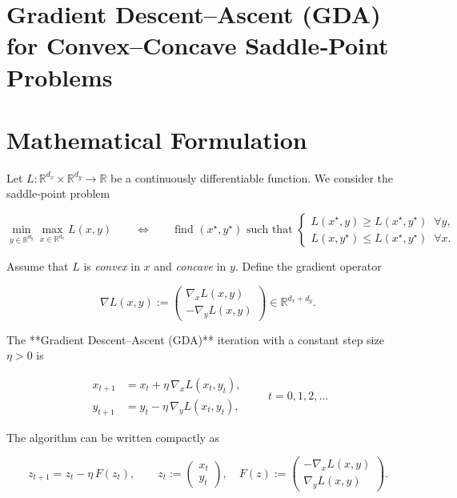 \documentclass{article}
\begin{document}
\section*{Gradient Descent–Ascent (GDA) for Convex–Concave Saddle‑Point Problems}

\section*{Mathematical Formulation}
Let $L:\mathbb{R}^{d_x}\times\mathbb{R}^{d_y}\rightarrow\mathbb{R}$ be a continuously differentiable function.  
We consider the saddle‑point problem  

\[
\min_{y\in\mathbb{R}^{d_y}}\max_{x\in\mathbb{R}^{d_x}} L(x,y)
\qquad\Longleftrightarrow\qquad
\text{find }(x^{\star},y^{\star})\text{ such that }
\begin{cases}
L(x^{\star},y)\ge L(x^{\star},y^{\star})\;\;\forall y,\\[2mm]
L(x,y^{\star})\le L(x^{\star},y^{\star})\;\;\forall x .
\end{cases}
\]

Assume that $L$ is \emph{convex} in $x$ and \emph{concave} in $y$.  
Define the gradient operator  

\[
\nabla L(x,y):=
\begin{pmatrix}
\nabla_{x}L(x,y)\\[1mm]
-\nabla_{y}L(x,y)
\end{pmatrix}
\in\mathbb{R}^{d_x+d_y}.
\]

The **Gradient Descent–Ascent (GDA)** iteration with a constant step size $\eta>0$ is  

\[
\boxed{
\begin{aligned}
x_{t+1}&=x_{t}+ \eta\,\nabla_{x}L(x_{t},y_{t}),\\
y_{t+1}&=y_{t}- \eta\,\nabla_{y}L(x_{t},y_{t}),
\end{aligned}}
\qquad t=0,1,2,\dots
\tag{1}
\]

The algorithm can be written compactly as  

\[
z_{t+1}=z_{t}-\eta\,F(z_{t}),\qquad 
z_{t}:=
\begin{pmatrix}x_{t}\\y_{t}\end{pmatrix},
\quad 
F(z):=
\begin{pmatrix}
-\nabla_{x}L(x,y)\\[1mm]
 \nabla_{y}L(x,y)
\end{pmatrix}.
\tag{2}
\]
\end{document}
